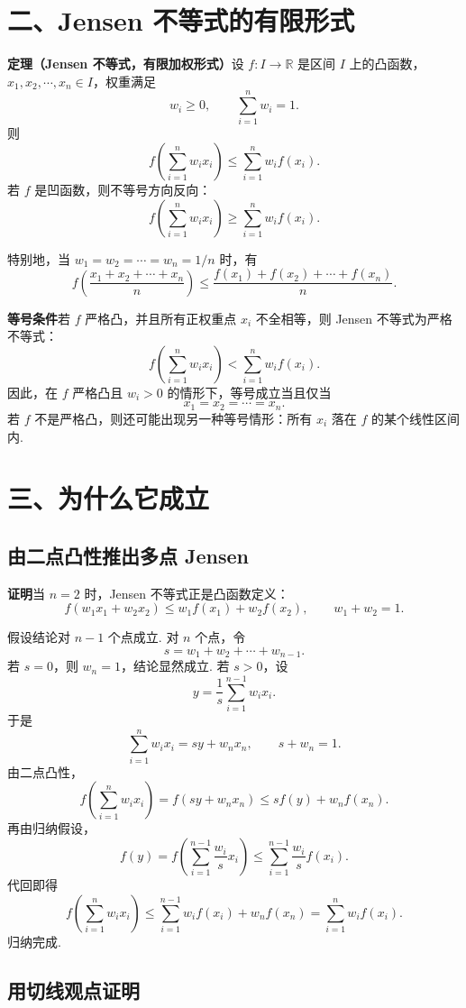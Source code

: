 \documentclass[UTF8,12pt,a4paper,fontset=fandol]{ctexart}
\begin{document}
\section*{二、Jensen 不等式的有限形式}

\noindent\textbf{定理（Jensen 不等式，有限加权形式）}\quad 设 $f:I\to\mathbb R$ 是区间 $I$ 上的凸函数，$x_1,x_2,\cdots,x_n\in I$，权重满足
\[
  w_i\ge0,\qquad \sum_{i=1}^n w_i=1.
\]
则
\[
  f\left(\sum_{i=1}^n w_i x_i\right)
  \le
  \sum_{i=1}^n w_i f(x_i).
\]
若 $f$ 是凹函数，则不等号方向反向：
\[
  f\left(\sum_{i=1}^n w_i x_i\right)
  \ge
  \sum_{i=1}^n w_i f(x_i).
\]

特别地，当 $w_1=w_2=\cdots=w_n=1/n$ 时，有
\[
  f\left(\frac{x_1+x_2+\cdots+x_n}{n}\right)
  \le
  \frac{f(x_1)+f(x_2)+\cdots+f(x_n)}{n}.
\]

\noindent\textbf{等号条件}\quad 若 $f$ 严格凸，并且所有正权重点 $x_i$ 不全相等，则 Jensen 不等式为严格不等式：
\[
  f\left(\sum_{i=1}^n w_i x_i\right)
  <
  \sum_{i=1}^n w_i f(x_i).
\]
因此，在 $f$ 严格凸且 $w_i>0$ 的情形下，等号成立当且仅当
\[
  x_1=x_2=\cdots=x_n.
\]
若 $f$ 不是严格凸，则还可能出现另一种等号情形：所有 $x_i$ 落在 $f$ 的某个线性区间内.

\section*{三、为什么它成立}

\subsection*{由二点凸性推出多点 Jensen}

\noindent\textbf{证明}\quad 当 $n=2$ 时，Jensen 不等式正是凸函数定义：
\[
  f(w_1x_1+w_2x_2)
  \le
  w_1f(x_1)+w_2f(x_2),
  \qquad w_1+w_2=1.
\]

假设结论对 $n-1$ 个点成立. 对 $n$ 个点，令
\[
  s=w_1+w_2+\cdots+w_{n-1}.
\]
若 $s=0$，则 $w_n=1$，结论显然成立. 若 $s>0$，设
\[
  y=\frac{1}{s}\sum_{i=1}^{n-1}w_i x_i.
\]
于是
\[
  \sum_{i=1}^n w_i x_i=sy+w_nx_n,\qquad s+w_n=1.
\]
由二点凸性，
\[
  f\left(\sum_{i=1}^n w_i x_i\right)
  =f(sy+w_nx_n)
  \le
  sf(y)+w_nf(x_n).
\]
再由归纳假设，
\[
  f(y)
  =
  f\left(\sum_{i=1}^{n-1}\frac{w_i}{s}x_i\right)
  \le
  \sum_{i=1}^{n-1}\frac{w_i}{s}f(x_i).
\]
代回即得
\[
  f\left(\sum_{i=1}^n w_i x_i\right)
  \le
  \sum_{i=1}^{n-1}w_if(x_i)+w_nf(x_n)
  =
  \sum_{i=1}^n w_if(x_i).
\]
归纳完成.

\subsection*{用切线观点证明}
\end{document}
